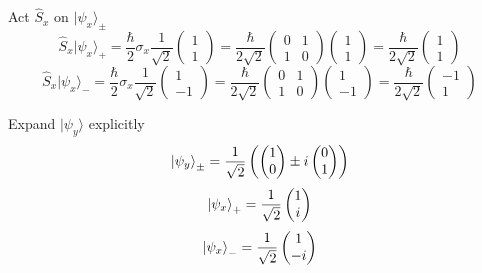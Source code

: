 \documentclass[12pt]{article}
\begin{document}
        Act $\hat{S}_x$ on $|\psi_x \rangle_\pm$
        \[
            \hat{S}_x|\psi_x\rangle_+ = \frac{\hbar}{2} \sigma_x \frac{1}{\sqrt{2}} \begin{pmatrix}
                1 \\ 1
            \end{pmatrix} = \frac{\hbar}{2\sqrt{2}} \begin{pmatrix}
                0 & 1 \\
                1 & 0
            \end{pmatrix} \begin{pmatrix}
                1 \\ 1
            \end{pmatrix} = \frac{\hbar}{2 \sqrt{2}} \begin{pmatrix}
                1 \\ 1
            \end{pmatrix}
        \]
        \[
            \hat{S}_x|\psi_x\rangle_- = \frac{\hbar}{2} \sigma_x \frac{1}{\sqrt{2}} \begin{pmatrix}
                1 \\ -1
            \end{pmatrix} = \frac{\hbar}{2\sqrt{2}} \begin{pmatrix}
                0 & 1 \\
                1 & 0
            \end{pmatrix} \begin{pmatrix}
                1 \\ -1
            \end{pmatrix} = \frac{\hbar}{2 \sqrt{2}} \begin{pmatrix}
                -1 \\ 1
            \end{pmatrix}
        \]

        Expand $|\psi_y\rangle$ explicitly
        \[
            \ket{\psi_y}_{\pm} = \frac{1}{\sqrt{2}} \left( \begin{pmatrix}
                1 \\ 0
            \end{pmatrix} \pm i\begin{pmatrix}
                0 \\ 1
            \end{pmatrix} \right)
        \]
        \[
            \ket{\psi_x}_{+} = \frac{1}{\sqrt{2}} \begin{pmatrix}
                1 \\ i
            \end{pmatrix}
        \]
        \[
            \ket{\psi_x}_{-} = \frac{1}{\sqrt{2}} \begin{pmatrix}
                1 \\ -i
            \end{pmatrix}
        \]
        
\end{document}
